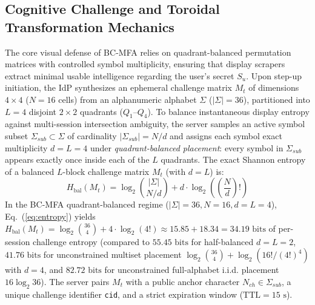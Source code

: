 \subsection{Cognitive Challenge and Toroidal Transformation Mechanics}
The core visual defense of BC-MFA relies on quadrant-balanced permutation matrices with controlled symbol multiplicity, ensuring that display scrapers extract minimal usable intelligence regarding the user's secret $S_u$. Upon step-up initiation, the IdP synthesizes an ephemeral challenge matrix $M_t$ of dimensions $4 \times 4$ ($N = 16$ cells) from an alphanumeric alphabet $\Sigma$ ($|\Sigma| = 36$), partitioned into $L = 4$ disjoint $2 \times 2$ quadrants ($Q_1$--$Q_4$). To balance instantaneous display entropy against multi-session intersection ambiguity, the server samples an active symbol subset $\Sigma_{sub} \subset \Sigma$ of cardinality $|\Sigma_{sub}| = N / d$ and assigns each symbol exact multiplicity $d = L = 4$ under \textit{quadrant-balanced placement}: every symbol in $\Sigma_{sub}$ appears exactly once inside each of the $L$ quadrants. The exact Shannon entropy of a balanced $L$-block challenge matrix $M_t$ (with $d = L$) is:
\begin{equation}
H_{\text{bal}}(M_t) = \log_2 \binom{|\Sigma|}{N/d} + d \cdot \log_2 \!\left( \left(\frac{N}{d}\right)! \right)
\label{eq:entropy}
\end{equation}
In the BC-MFA quadrant-balanced regime ($|\Sigma| = 36, N = 16, d = L = 4$), Eq.~(\ref{eq:entropy}) yields $H_{\text{bal}}(M_t) = \log_2 \binom{36}{4} + 4 \cdot \log_2(4!) \approx 15.85 + 18.34 = 34.19\text{ bits}$ of per-session challenge entropy (compared to $55.45\text{ bits}$ for half-balanced $d = L = 2$, $41.76\text{ bits}$ for unconstrained multiset placement $\log_2\binom{36}{4} + \log_2(16!/(4!)^4)$ with $d = 4$, and $82.72\text{ bits}$ for unconstrained full-alphabet i.i.d. placement $16 \log_2 36$). The server pairs $M_t$ with a public anchor character $N_{ch} \in \Sigma_{sub}$, a unique challenge identifier \texttt{cid}, and a strict expiration window ($\text{TTL} = 15\text{ s}$).


